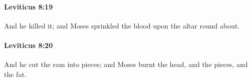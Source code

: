 		\paragraph{Leviticus 8:19} %
			\label{LEVITICUS-8-19}

			And he killed it; and Moses sprinkled the blood upon the altar round about.


		\paragraph{Leviticus 8:20} %
			\label{LEVITICUS-8-20}

			And he cut the ram into pieces; and Moses burnt the head, and the pieces, and the fat.


